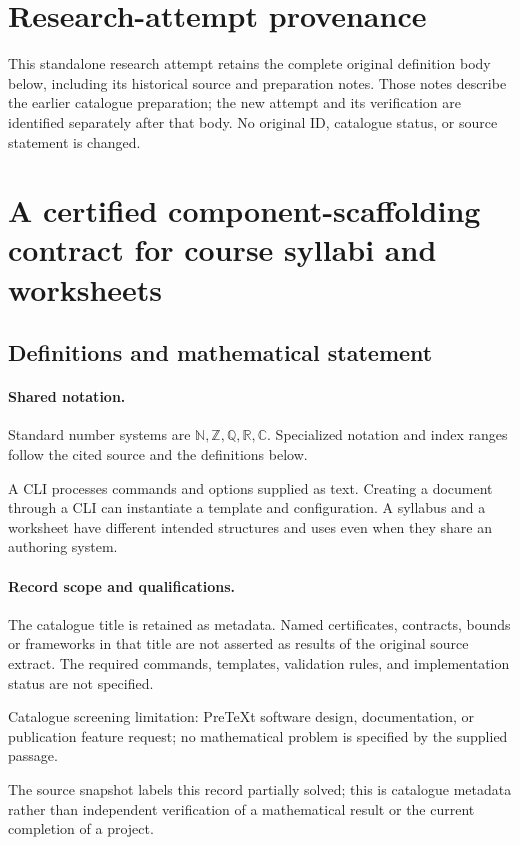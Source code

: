 \documentclass[11pt]{article}
\begin{document}
\section*{Research-attempt provenance}
This standalone research attempt retains the complete original definition body below,
including its historical source and preparation notes. Those notes describe the
earlier catalogue preparation; the new attempt and its verification are identified
separately after that body. No original ID, catalogue status, or source statement is changed.

\section{A certified component-scaffolding contract for course syllabi and worksheets}\label{statement}

\subsection{Definitions and mathematical statement}

\paragraph{Shared notation.}Standard number systems are $\mathbb N,\mathbb Z,\mathbb Q,\mathbb R,\mathbb C$. Specialized notation and index ranges follow the cited source and the definitions below.


A CLI processes commands and options supplied as text. Creating a document through a CLI can instantiate a template and configuration. A syllabus and a worksheet have different intended structures and uses even when they share an authoring system.
\paragraph{Record scope and qualifications.}
The catalogue title is retained as metadata. Named certificates, contracts, bounds or frameworks in that title are not asserted as results of the original source extract.
The required commands, templates, validation rules, and implementation status are not specified.

Catalogue screening limitation: PreTeXt software design, documentation, or publication feature request; no mathematical problem is specified by the supplied passage.

The source snapshot labels this record partially solved; this is catalogue metadata rather than independent verification of a mathematical result or the current completion of a project.
\end{document}
